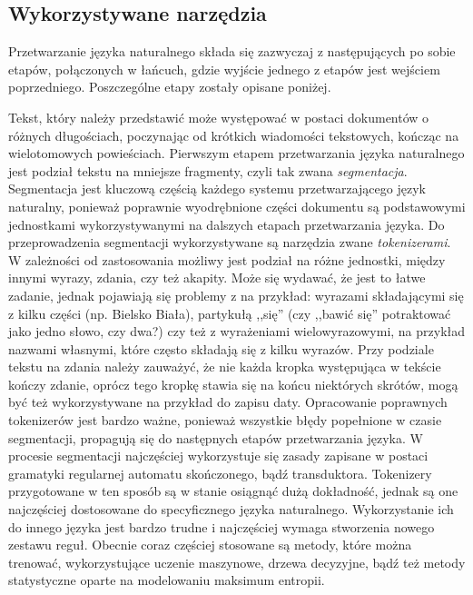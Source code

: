 \documentclass[a4paper, twoside, 12pt]{report}
\begin{document}
        \subsection{Wykorzystywane narzędzia}
            Przetwarzanie języka naturalnego składa się zazwyczaj z następujących po sobie etapów, połączonych w łańcuch,
            gdzie wyjście jednego z etapów jest wejściem poprzedniego. Poszczególne etapy zostały opisane poniżej.

            Tekst, który należy przedstawić może występować w postaci dokumentów o różnych długościach, poczynając od
            krótkich wiadomości tekstowych, kończąc na wielotomowych powieściach. Pierwszym etapem przetwarzania języka
            naturalnego jest podział tekstu na mniejsze fragmenty, czyli tak zwana \emph{segmentacja}. Segmentacja jest
            kluczową częścią każdego systemu przetwarzającego język naturalny, ponieważ poprawnie wyodrębnione części
            dokumentu są podstawowymi jednostkami wykorzystywanymi na dalszych etapach przetwarzania języka.
            Do przeprowadzenia segmentacji wykorzystywane są narzędzia zwane
            \emph{tokenizerami}.%
            W zależności od zastosowania możliwy jest podział na różne jednostki, między innymi wyrazy, zdania, czy też akapity.
            Może się wydawać, że jest to łatwe zadanie, jednak pojawiają się problemy z na przykład: wyrazami składającymi
            się z kilku części (np. Bielsko Biała), partykułą ,,się'' (czy ,,bawić się'' potraktować jako jedno słowo, czy dwa?)
            czy też z wyrażeniami wielowyrazowymi, na przykład nazwami własnymi, które często składają się z kilku wyrazów.
            Przy podziale tekstu na zdania należy zauważyć, że nie każda kropka występująca w tekście kończy zdanie, oprócz
            tego kropkę stawia się na końcu niektórych skrótów, mogą być też wykorzystywane na przykład do zapisu daty.
            Opracowanie poprawnych tokenizerów jest bardzo ważne, ponieważ wszystkie błędy popełnione w czasie segmentacji,
            propagują się do następnych etapów przetwarzania języka. W procesie segmentacji najczęściej wykorzystuje się
            zasady zapisane w postaci gramatyki regularnej automatu skończonego, bądź transduktora. Tokenizery przygotowane
            w ten sposób są w stanie osiągnąć dużą dokładność, jednak są one najczęściej dostosowane do specyficznego języka
            naturalnego. Wykorzystanie ich do innego języka jest bardzo trudne i najczęściej wymaga stworzenia nowego
            zestawu reguł. Obecnie coraz częściej stosowane są metody, które można trenować, wykorzystujące uczenie maszynowe,
            drzewa decyzyjne, bądź też metody statystyczne oparte na modelowaniu maksimum entropii\cite{HANDBOOKNLP}.
\end{document}
